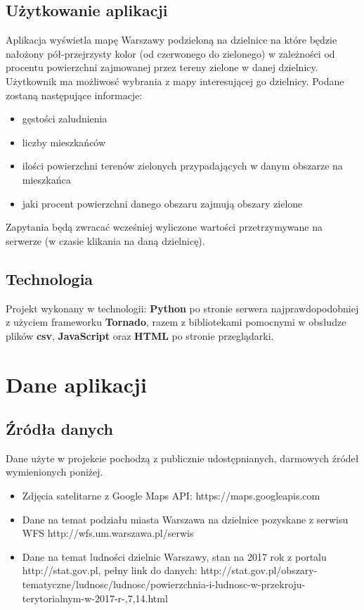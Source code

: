 \documentclass[11pt]{article}
\begin{document}
	\subsection{Użytkowanie aplikacji}
		Aplikacja wyświetla mapę Warszawy podzieloną na dzielnice na które będzie nałożony pół-przejrzysty kolor (od czerwonego do zielonego) w zależności od procentu powierzchni zajmowanej przez tereny zielone w danej dzielnicy. Użytkownik ma możliwosć wybrania z mapy interesującej go dzielnicy. Podane zostaną następujące informacje:
    \begin{itemize}
      \item gęstości zaludnienia
      \item liczby mieszkańców  
      \item ilości powierzchni terenów zielonych przypadających w danym obszarze na mieszkańca
      \item jaki procent powierzchni danego obszaru zajmują obszary zielone
    \end{itemize}
Zapytania będą zwracać wcześniej wyliczone wartości przetrzymywane na serwerze (w czasie klikania na daną dzielnicę). 


	\subsection{Technologia}
		Projekt wykonany w technologii: \textbf{Python} po stronie serwera najprawdopodobniej z użyciem frameworku \textbf{Tornado}, razem z bibliotekami pomocnymi w obsłudze plików \textbf{csv}, \textbf{JavaScript} oraz \textbf{HTML} po stronie przeglądarki.  

	
	\section{Dane aplikacji}
	\subsection{Źródła danych}
		Dane użyte w projekcie pochodzą z publicznie udostępnianych, darmowych źródeł wymienionych poniżej.
	
	\begin{itemize}
	\item Zdjęcia satelitarne z Google Maps API: https://maps.googleapis.com
	\item Dane na temat podziału miasta Warszawa na dzielnice pozyskane z serwisu WFS http://wfs.um.warszawa.pl/serwis
	\item Dane na temat ludności dzielnic Warszawy, stan na 2017 rok z portalu http://stat.gov.pl, pełny link do danych: http://stat.gov.pl/obszary-tematyczne/ludnosc/ludnosc/powierzchnia-i-ludnosc-w-przekroju-terytorialnym-w-2017-r-,7,14.html
	\end{itemize}
\end{document}
